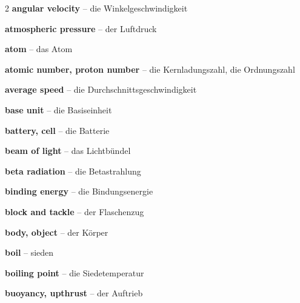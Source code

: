 \begin{multicols}{2}
\textbf{angular velocity} -- die Winkelgeschwindigkeit\dotfill\hyperref[e:54]{\pageref*{e:54}}\par
\textbf{atmospheric pressure} -- der Luftdruck\dotfill\hyperref[e:91]{\pageref*{e:91}}\par
\textbf{atom} -- das Atom\dotfill\hyperref[e:259]{\pageref*{e:259}}\par
\textbf{atomic number, proton number} -- die Kernladungszahl, die Ordnungszahl\dotfill\hyperref[e:267]{\pageref*{e:267}}\par
\textbf{average speed} -- die Durchschnittsgeschwindigkeit\dotfill\hyperref[e:38]{\pageref*{e:38}}\par

\par\nopagebreak
\textbf{base unit} -- die Basiseinheit\dotfill\hyperref[e:4]{\pageref*{e:4}}\par
\textbf{battery, cell} -- die Batterie\dotfill\hyperref[e:156]{\pageref*{e:156}}\par
\textbf{beam of light} -- das Lichtbündel\dotfill\hyperref[e:223]{\pageref*{e:223}}\par
\textbf{beta radiation} -- die Betastrahlung\dotfill\hyperref[e:276]{\pageref*{e:276}}\par
\textbf{binding energy} -- die Bindungsenergie\dotfill\hyperref[e:290]{\pageref*{e:290}}\par
\textbf{block and tackle} -- der Flaschenzug\dotfill\hyperref[e:87]{\pageref*{e:87}}\par
\textbf{body, object} -- der Körper\dotfill\hyperref[e:28]{\pageref*{e:28}}\par
\textbf{boil} -- sieden\dotfill\hyperref[e:132]{\pageref*{e:132}}\par
\textbf{boiling point} -- die Siedetemperatur\dotfill\hyperref[e:136]{\pageref*{e:136}}\par
\textbf{buoyancy, upthrust} -- der Auftrieb\dotfill\hyperref[e:92]{\pageref*{e:92}}\par


\end{multicols}
